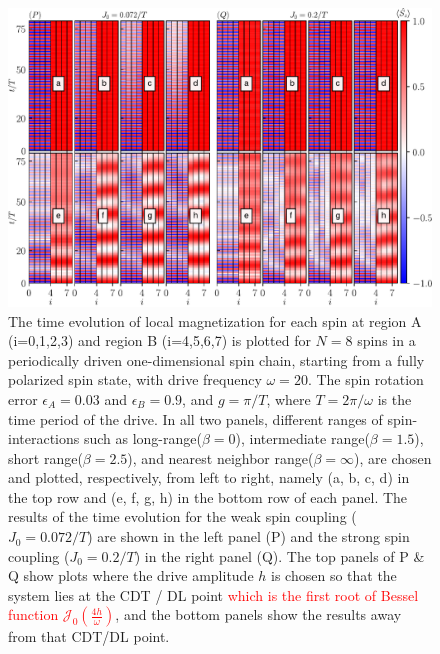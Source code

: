 \documentclass[12pt]{iopart}
\newcommand{\red}[1]{\textcolor{red}{#1}}
\begin{document}
\begin{figure}[t!]
    \centering
    \hspace{2cm}\includegraphics[width=13.5cm]{figure4.pdf}
    \caption{The time evolution of local magnetization for each spin at region A (i=0,1,2,3) and region B (i=4,5,6,7) is plotted for $N=8$ spins in a periodically driven one-dimensional spin chain, starting from a fully polarized spin state, with drive frequency $\omega=20$. The spin rotation error $\epsilon_A = 0.03$ and $\epsilon_B = 0.9$, and $g=\pi/T$, where $T=2\pi/\omega$ is the time period of the drive.  In all two panels, different ranges of spin-interactions such as long-range($\beta=0$), intermediate range($\beta=1.5$), short range($\beta=2.5$), and nearest neighbor range($\beta=\infty$), are chosen and plotted, respectively, from left to right, namely (a, b, c, d) in the top row and (e, f, g, h) in the bottom row of each panel. The results of the time evolution for the weak spin coupling ($J_0 = 0.072/T$) are shown in the left panel (P) and the strong spin coupling ($J_0 = 0.2/T$) in the right panel (Q). The top panels of P \& Q show plots where the drive amplitude $h$ is chosen so that the system lies at the CDT / DL point \red{which is the first root of Bessel function $\mathcal{J}_0\left(\frac{4h}{\omega}\right)$}, and the bottom panels show the results away from that CDT/DL point.}
    \label{Fig:strong_weak_ea}
\end{figure}
\end{document}
